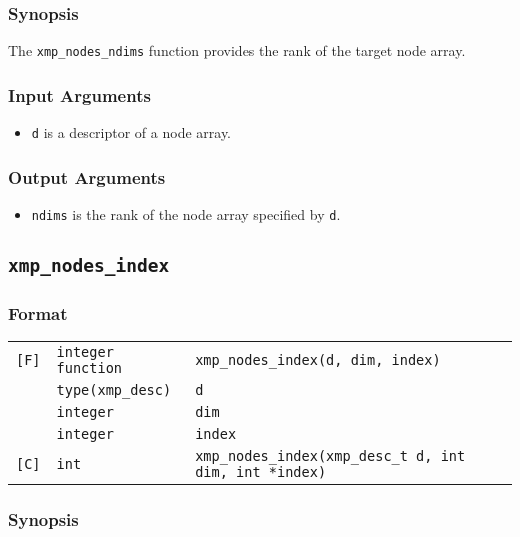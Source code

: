\subsubsection*{Synopsis}

The {\tt xmp\_nodes\_ndims} function provides the rank of the target node
array.

\subsubsection*{Input Arguments}
\begin{itemize}
 \item {\tt d} is a descriptor of a node array.
\end{itemize}

\subsubsection*{Output Arguments}
\begin{itemize}
 \item {\tt ndims} is the rank of the node array specified by {\tt d}.
\end{itemize}


\subsection{\tt xmp\_nodes\_index}

\subsubsection*{Format}

\begin{tabular}{lll}

\verb![F]!& {\tt integer function}& {\tt xmp\_nodes\_index(d, dim, index)}\\
          & {\tt type(xmp\_desc)} & {\tt d}\\
          & {\tt integer} & {\tt dim}\\
          & {\tt integer} & {\tt index}\\

\verb![C]!&  {\tt int}& {\tt xmp\_nodes\_index(xmp\_desc\_t d, int dim, int *index)}\\

\end{tabular}

\subsubsection*{Synopsis}

